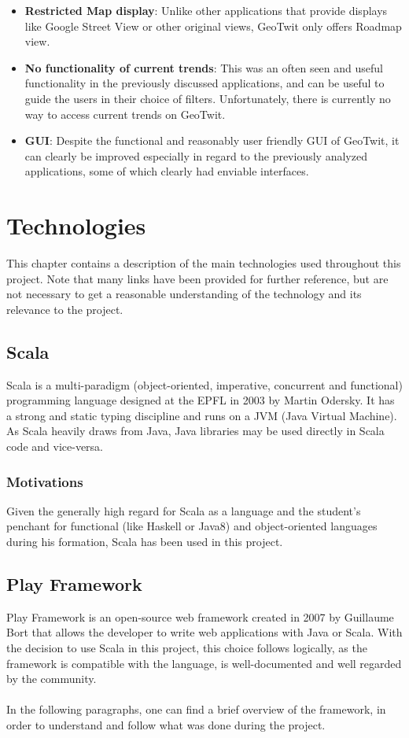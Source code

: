 \documentclass[a4paper,11pt]{report}
\begin{document}
\begin{itemize}
	\item \textbf{Restricted Map display}: Unlike other applications that provide displays like Google Street View or other original views, GeoTwit only offers Roadmap view.
	\item \textbf{No functionality of current trends}: This was an often seen and useful functionality in the previously discussed applications, and can be useful to guide the users in their choice of filters. Unfortunately, there is currently no way to access current trends on GeoTwit.
	\item \textbf{GUI}: Despite the functional and reasonably user friendly GUI of GeoTwit, it can clearly be improved especially in regard to the previously analyzed applications, some of which clearly had enviable interfaces.
\end{itemize}
\color{black}
\renewcommand{\labelitemi}{\textbullet}

\section{Technologies}
This chapter contains a description of the main technologies used throughout this project. Note that many links have been provided for further reference, but are not necessary to get a reasonable understanding of the technology and its relevance to the project.

\subsection{Scala}
Scala is a multi-paradigm (object-oriented, imperative, concurrent and functional) programming language designed at the EPFL in 2003 by Martin Odersky. It has a strong and static typing discipline and runs on a JVM (Java Virtual Machine). As Scala heavily draws from Java, Java libraries may be used directly in Scala code and vice-versa.

\subsubsection{Motivations}
Given the generally high regard for Scala as a language and the student’s penchant for functional (like Haskell or Java8) and object-oriented languages during his formation, Scala has been used in this project.

\subsection{Play Framework}
Play Framework is an open-source web framework created in 2007 by Guillaume Bort that allows the developer to write web applications with Java or Scala. With the decision to use Scala in this project, this choice follows logically, as the framework is compatible with the language, is well-documented and well regarded by the community.\\\\
In the following paragraphs, one can find a brief overview of the framework, in order to understand and follow what was done during the project.
\end{document}
